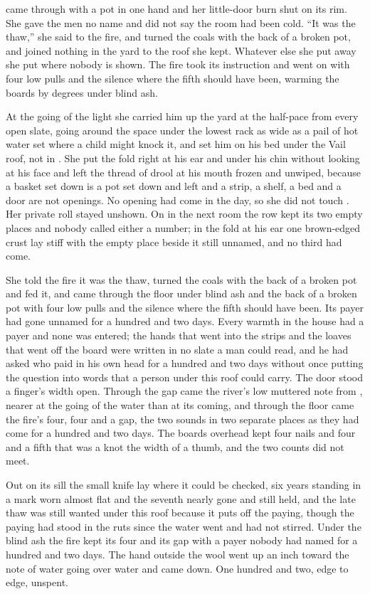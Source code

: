  came through with a pot in one hand and her little-door burn shut on its rim. She gave the men no name and did not say the room had been cold. “It was the thaw,” she said to the fire, and turned the coals with the back of a broken pot, and joined nothing in the yard to the roof she kept. Whatever else she put away she put where nobody is shown. The fire took its instruction and went on with four low pulls and the silence where the fifth should have been, warming the boards by degrees under blind ash.

\scenebreak

At the going of the light she carried him up the yard at the half-pace from every open slate, going around the space under the lowest rack as wide as a pail of hot water set where a child might knock it, and set him on his bed under the Vail roof, not in . She put the fold right at his ear and under his chin without looking at his face and left the thread of drool at his mouth frozen and unwiped, because a basket set down is a pot set down and left and a strip, a shelf, a bed and a door are not openings. No opening had come in the day, so she did not touch . Her private roll stayed unshown. On  in the next room the row kept its two empty places and nobody called either a number; in the fold at his ear one brown-edged crust lay stiff with the empty place beside it still unnamed, and no third had come.

She told the fire it was the thaw, turned the coals with the back of a broken pot and fed it, and  came through the floor under blind ash and the back of a broken pot with four low pulls and the silence where the fifth should have been. Its payer had gone unnamed for a hundred and two days. Every warmth in the house had a payer and none was entered; the hands that went into the strips and the loaves that went off the board were written in no slate a man could read, and he had asked who paid in his own head for a hundred and two days without once putting the question into words that a person under this roof could carry. The door stood a finger's width open. Through the gap came the river's low muttered note from , nearer at the going of the water than at its coming, and through the floor came the fire's four, four and a gap, the two sounds in two separate places as they had come for a hundred and two days. The boards overhead kept four nails and four and a fifth that was a knot the width of a thumb, and the two counts did not meet.

Out on its sill the small knife lay where it could be checked, six years standing in a mark worn almost flat and the seventh nearly gone and still held, and the late thaw was still wanted under this roof because it puts off the paying, though the paying had stood in the ruts since the water went and had not stirred. Under the blind ash the fire kept its four and its gap with a payer nobody had named for a hundred and two days. The hand outside the wool went up an inch toward the note of water going over water and came down. One hundred and two, edge to edge, unspent.
